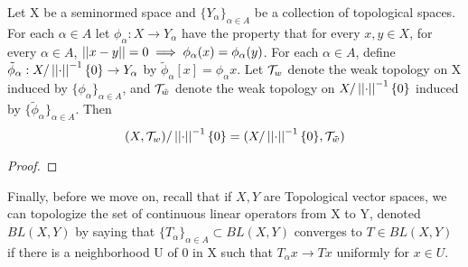 \begin{prop}
    \label{prop:weakquotients}
    Let X be a seminormed space and $\{Y_\alpha\}_{\alpha \in A}$ be a collection of topological spaces. For each $\alpha \in A$ let $\phi_\alpha:X \to Y_\alpha$ have the property that for every $x,y \in X$, for every $\alpha \in A$, $\left|\left| x-y \right|\right|=0 \implies \phi_\alpha(x)=\phi_\alpha(y)$. 
    For each $\alpha \in A$, define $\tilde{\phi}_\alpha:X/\left|\left| \cdot \right|\right|^{-1}\{0\} \to Y_\alpha$ by
    $\tilde{\phi}_{\alpha}[x] = \phi_\alpha x$. Let $\mathcal{T}_w$ denote the weak topology on X induced by $\{\phi_\alpha\}_{\alpha \in A}$, and $\mathcal{T}_{\tilde{w}}$ denote the weak topology on $X/\left|\left| \cdot \right|\right|^{-1}\{0\}$ induced by $\{\tilde{\phi}_{\alpha}\}_{\alpha \in A}$. Then 
    \begin{equation}
        (X,\mathcal{T}_w)/\left|\left| \cdot \right|\right|^{-1}\{0\} = (X/\left|\left| \cdot \right|\right|^{-1}\{0\}, \mathcal{T}_{\tilde{w}})
    \end{equation}
    \begin{proof}
    \end{proof} 
\end{prop} 


Finally, before we move on, recall that if $X,Y$ are Topological vector spaces, we can topologize the set of continuous linear operators from X to Y, denoted $BL(X,Y)$ by saying that $\{T_\alpha\}_{\alpha \in A} \subset BL(X,Y)$ converges to $T \in BL(X,Y)$ if there is a neighborhood U of 0 in X such that $T_{\alpha}x \to Tx$ uniformly for $x \in U$. 